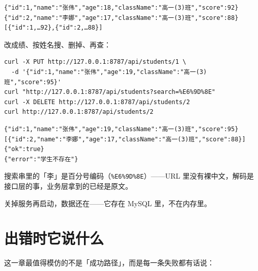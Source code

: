 \par
\medskip
\begin{lstlisting}[style=out]
{"id":1,"name":"张伟","age":18,"className":"高一(3)班","score":92}
{"id":2,"name":"李娜","age":17,"className":"高一(3)班","score":88}
[{"id":1,…92},{"id":2,…88}]
\end{lstlisting}
\par
\medskip

改成绩、按姓名搜、删掉、再查：

\par
\medskip
\begin{lstlisting}[style=sh]
curl -X PUT http://127.0.0.1:8787/api/students/1 \
  -d '{"id":1,"name":"张伟","age":19,"className":"高一(3)班","score":95}'
curl "http://127.0.0.1:8787/api/students?search=%E6%9D%8E"
curl -X DELETE http://127.0.0.1:8787/api/students/2
curl http://127.0.0.1:8787/api/students/2
\end{lstlisting}
\par
\medskip

\par
\medskip
\begin{lstlisting}[style=out]
{"id":1,"name":"张伟","age":19,"className":"高一(3)班","score":95}
[{"id":2,"name":"李娜","age":17,"className":"高一(3)班","score":88}]
{"ok":true}
{"error":"学生不存在"}
\end{lstlisting}
\par
\medskip

搜索串里的「李」是百分号编码（\texttt{\%E6\%9D\%8E}）——URL 里没有裸中文，解码是接口层的事，业务层拿到的已经是原文。

关掉服务再启动，数据还在——它存在 MySQL 里，不在内存里。

\section{出错时它说什么}

这一章最值得模仿的不是「成功路径」，而是每一条失败都有话说：

